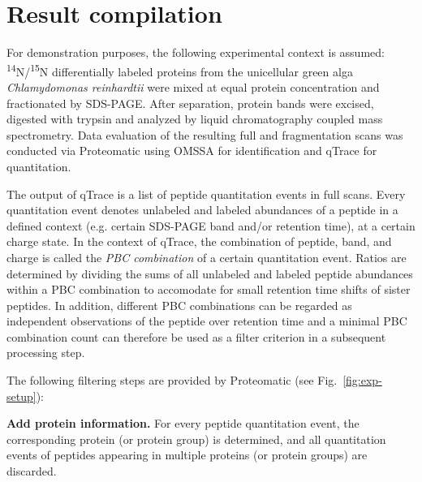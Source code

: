 \section*{Result compilation}

For demonstration purposes, the following experimental context is assumed:
\textsuperscript{14}N/\textsuperscript{15}N differentially labeled proteins from 
the unicellular green alga {\em Chlamydomonas reinhardtii} were mixed at equal 
protein concentration and fractionated by SDS-PAGE. After separation, protein 
bands were excised, digested with trypsin and analyzed by liquid chromatography 
coupled mass spectrometry.
Data evaluation of the resulting full and fragmentation scans was conducted via 
Proteomatic using OMSSA for identification and qTrace for quantitation. 

The output of qTrace is a list of peptide quantitation events in full scans.
Every quantitation event denotes unlabeled and labeled abundances of a peptide 
in a defined context (e.g. certain SDS-PAGE band and/or retention time),
at a certain charge state.
In the context of qTrace, the combination of peptide, band, and charge is called 
the {\em PBC combination} of a certain quantitation event.
Ratios are determined by dividing the sums of all unlabeled and labeled peptide
abundances within a PBC combination to accomodate for small retention time
shifts of sister peptides.
In addition, different PBC combinations can be regarded as independent observations 
of the peptide over retention time and a minimal PBC combination count can therefore 
be used as a filter criterion in a subsequent processing step.

The following filtering steps are provided by Proteomatic (see Fig.~\ref{fig:exp-setup}):

{\bf Add protein information.}
For every peptide quantitation event, the corresponding protein (or
protein group) is determined, and all quantitation events of peptides 
appearing in multiple proteins (or protein groups) are discarded.

